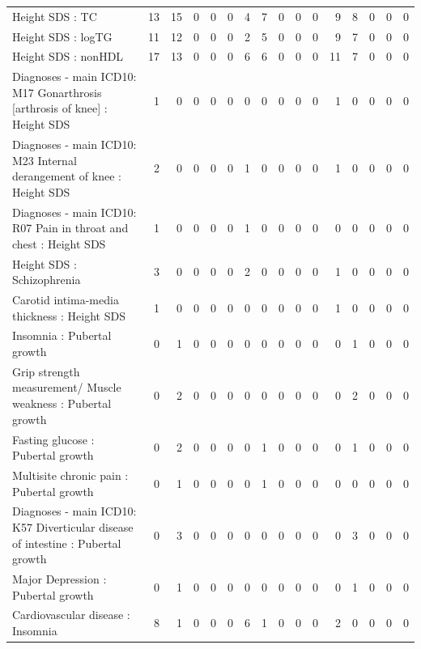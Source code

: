 \begin{table}[ht]
\begin{tabular}{lrrrrrrrrrrrrrrr}
  Height SDS : TC &  13 &  15 &   0 &   0 &   0 &   4 &   7 &   0 &   0 &   0 &   9 &   8 &   0 &   0 &   0 \\ 
  Height SDS : logTG &  11 &  12 &   0 &   0 &   0 &   2 &   5 &   0 &   0 &   0 &   9 &   7 &   0 &   0 &   0 \\ 
  Height SDS : nonHDL &  17 &  13 &   0 &   0 &   0 &   6 &   6 &   0 &   0 &   0 &  11 &   7 &   0 &   0 &   0 \\ 
  Diagnoses - main ICD10: M17 Gonarthrosis [arthrosis of knee] : Height SDS &   1 &   0 &   0 &   0 &   0 &   0 &   0 &   0 &   0 &   0 &   1 &   0 &   0 &   0 &   0 \\ 
  Diagnoses - main ICD10: M23 Internal derangement of knee : Height SDS &   2 &   0 &   0 &   0 &   0 &   1 &   0 &   0 &   0 &   0 &   1 &   0 &   0 &   0 &   0 \\ 
  Diagnoses - main ICD10: R07 Pain in throat and chest : Height SDS &   1 &   0 &   0 &   0 &   0 &   1 &   0 &   0 &   0 &   0 &   0 &   0 &   0 &   0 &   0 \\ 
  Height SDS : Schizophrenia &   3 &   0 &   0 &   0 &   0 &   2 &   0 &   0 &   0 &   0 &   1 &   0 &   0 &   0 &   0 \\ 
  Carotid intima-media thickness : Height SDS &   1 &   0 &   0 &   0 &   0 &   0 &   0 &   0 &   0 &   0 &   1 &   0 &   0 &   0 &   0 \\ 
  Insomnia : Pubertal growth  &   0 &   1 &   0 &   0 &   0 &   0 &   0 &   0 &   0 &   0 &   0 &   1 &   0 &   0 &   0 \\ 
  Grip strength measurement/ Muscle weakness : Pubertal growth  &   0 &   2 &   0 &   0 &   0 &   0 &   0 &   0 &   0 &   0 &   0 &   2 &   0 &   0 &   0 \\ 
  Fasting glucose : Pubertal growth  &   0 &   2 &   0 &   0 &   0 &   0 &   1 &   0 &   0 &   0 &   0 &   1 &   0 &   0 &   0 \\ 
  Multisite chronic pain : Pubertal growth  &   0 &   1 &   0 &   0 &   0 &   0 &   1 &   0 &   0 &   0 &   0 &   0 &   0 &   0 &   0 \\ 
  Diagnoses - main ICD10: K57 Diverticular disease of intestine : Pubertal growth  &   0 &   3 &   0 &   0 &   0 &   0 &   0 &   0 &   0 &   0 &   0 &   3 &   0 &   0 &   0 \\ 
  Major Depression : Pubertal growth  &   0 &   1 &   0 &   0 &   0 &   0 &   0 &   0 &   0 &   0 &   0 &   1 &   0 &   0 &   0 \\ 
  Cardiovascular disease : Insomnia &   8 &   1 &   0 &   0 &   0 &   6 &   1 &   0 &   0 &   0 &   2 &   0 &   0 &   0 &   0 \\ 

\end{tabular}
\end{table}
